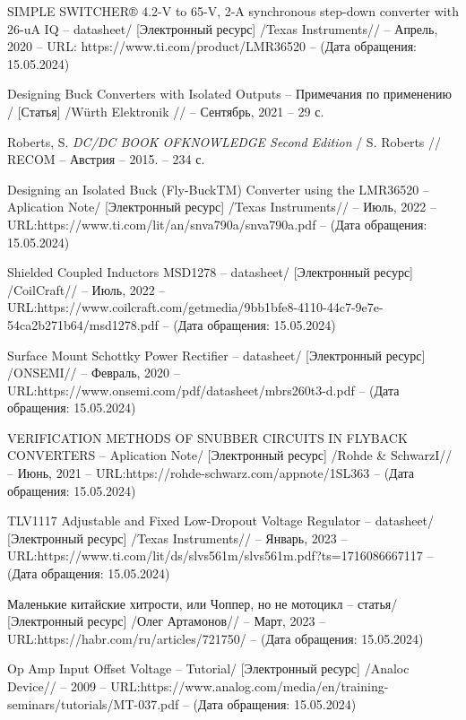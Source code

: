 \begin{thebibliography}{00}
 SIMPLE SWITCHER® 4.2-V to 65-V, 
2-A synchronous step-down converter with 26-uA IQ
  -- datasheet/
  [Электронный ресурс] /Texas Instruments// -- Апрель, 2020 -- 
  URL: https://www.ti.com/product/LMR36520
  -- (Дата обращения: 15.05.2024)

Designing Buck Converters with Isolated Outputs 
-- Примечания по применению /
[Статья] /Würth Elektronik // -- Сентябрь, 2021 -- 29 с.

 Roberts, S.
\emph{DC/DC BOOK OFKNOWLEDGE Second Edition} / S. Roberts // RECOM --
Австрия -- 2015. -- 234 с.

 Designing an Isolated Buck (Fly-BuckTM) Converter using
the LMR36520
  -- Aplication Note/
  [Электронный ресурс] /Texas Instruments// -- Июль, 2022 -- 
  URL:https://www.ti.com/lit/an/snva790a/snva790a.pdf
  -- (Дата обращения: 15.05.2024)


 Shielded Coupled Inductors MSD1278
-- datasheet/
[Электронный ресурс] /CoilCraft// -- Июль, 2022 -- 
URL:https://www.coilcraft.com/getmedia/9bb1bfe8-4110-44c7-9e7e-54ca2b271b64/msd1278.pdf
-- (Дата обращения: 15.05.2024)

 Surface Mount Schottky Power Rectifier
-- datasheet/
[Электронный ресурс] /ONSEMI// -- Февраль, 2020 -- 
URL:https://www.onsemi.com/pdf/datasheet/mbrs260t3-d.pdf
-- (Дата обращения: 15.05.2024)

 VERIFICATION METHODS OF SNUBBER CIRCUITS IN FLYBACK
CONVERTERS
-- Aplication Note/
[Электронный ресурс] /Rohde \& SchwarzI// -- Июнь, 2021 -- 
URL:https://rohde-schwarz.com/appnote/1SL363
-- (Дата обращения: 15.05.2024)

 TLV1117 Adjustable and Fixed Low-Dropout Voltage Regulator
  -- datasheet/
  [Электронный ресурс] /Texas Instruments// -- Январь, 2023 -- 
  URL:https://www.ti.com/lit/ds/slvs561m/slvs561m.pdf?ts=1716086667117
  -- (Дата обращения: 15.05.2024)

 Маленькие китайские хитрости, или Чоппер, но не мотоцикл
-- статья/
[Электронный ресурс] /Олег Артамонов// -- Март, 2023 -- 
URL:https://habr.com/ru/articles/721750/
-- (Дата обращения: 15.05.2024)

 Op Amp Input Offset Voltage 
-- Tutorial/
[Электронный ресурс] /Analoc Device// --  2009 -- 
URL:https://www.analog.com/media/en/training-seminars/tutorials/MT-037.pdf
-- (Дата обращения: 15.05.2024)


\end{thebibliography}
